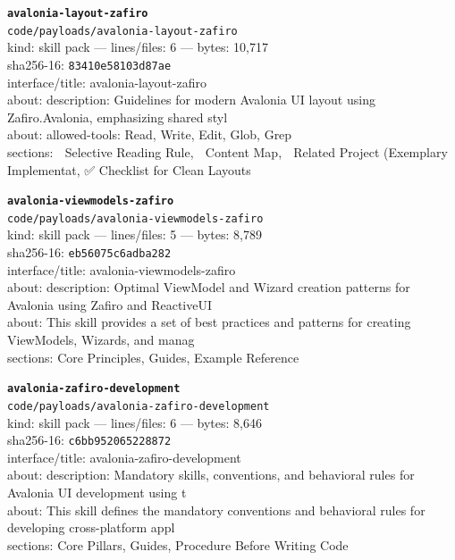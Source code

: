 \noindent\textbf{\texttt{avalonia-layout-zafiro}}\\
\texttt{code/payloads/avalonia-layout-zafiro}\\
kind: skill pack --- lines/files: 6 --- bytes: 10,717\\
sha256-16: \texttt{83410e58103d87ae}\\
interface/title: avalonia-layout-zafiro\\
about: description: Guidelines for modern Avalonia UI layout using Zafiro.Avalonia, emphasizing shared styl\\
about: allowed-tools: Read, Write, Edit, Glob, Grep\\
sections: 🎯 Selective Reading Rule, 📑 Content Map, 🔗 Related Project (Exemplary Implementat, ✅ Checklist for Clean Layouts\\
\vspace*{6.0pt}

\noindent\textbf{\texttt{avalonia-viewmodels-zafiro}}\\
\texttt{code/payloads/avalonia-viewmodels-zafiro}\\
kind: skill pack --- lines/files: 5 --- bytes: 8,789\\
sha256-16: \texttt{eb56075c6adba282}\\
interface/title: avalonia-viewmodels-zafiro\\
about: description: Optimal ViewModel and Wizard creation patterns for Avalonia using Zafiro and ReactiveUI\\
about: This skill provides a set of best practices and patterns for creating ViewModels, Wizards, and manag\\
sections: Core Principles, Guides, Example Reference\\
\vspace*{6.0pt}
\newpage

\noindent\textbf{\texttt{avalonia-zafiro-development}}\\
\texttt{code/payloads/avalonia-zafiro-development}\\
kind: skill pack --- lines/files: 6 --- bytes: 8,646\\
sha256-16: \texttt{c6bb952065228872}\\
interface/title: avalonia-zafiro-development\\
about: description: Mandatory skills, conventions, and behavioral rules for Avalonia UI development using t\\
about: This skill defines the mandatory conventions and behavioral rules for developing cross-platform appl\\
sections: Core Pillars, Guides, Procedure Before Writing Code\\
\vspace*{6.0pt}

